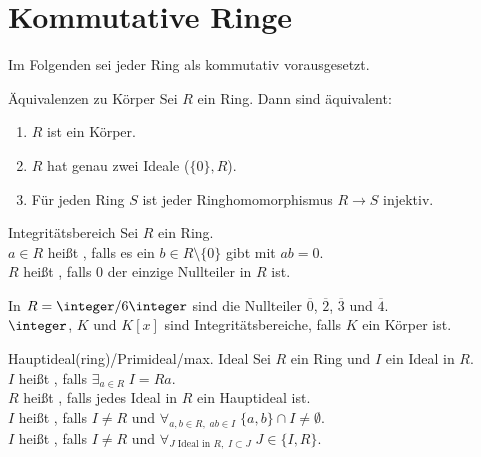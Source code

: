 \section{%
    Kommutative Ringe%
}

\begin{Bem}
    Im Folgenden sei jeder Ring als kommutativ vorausgesetzt.
\end{Bem}

\begin{Prop}{Äquivalenzen zu Körper}
    Sei $R$ ein Ring.
    Dann sind äquivalent:
    \begin{enumerate}[label=(\alph*)]
        \item
        $R$ ist ein Körper.

        \item
        $R$ hat genau zwei Ideale ($\{0\}, R$).

        \item
        Für jeden Ring $S$ ist jeder Ringhomomorphismus $R \rightarrow S$
        injektiv.
    \end{enumerate}
\end{Prop}

\begin{Def}{Integritätsbereich}
    Sei $R$ ein Ring.\\
    $a \in R$ heißt , falls es ein
    $b \in R \setminus \{0\}$ gibt mit $ab = 0$.\\
    $R$ heißt , falls $0$ der einzige Nullteiler
    in $R$ ist.
\end{Def}

\begin{Bsp}
    In $R = \integer/6\integer$ sind die Nullteiler $\overline{0}$,
    $\overline{2}$, $\overline{3}$ und $\overline{4}$.\\
    $\integer$, $K$ und $K[x]$ sind Integritätsbereiche, falls
    $K$ ein Körper ist.
\end{Bsp}

\linie

\begin{Def}{Hauptideal(ring)/Primideal/max. Ideal}
    Sei $R$ ein Ring und $I$ ein Ideal in $R$.\\
    $I$ heißt , falls $\exists_{a \in R}\; I = Ra$.\\
    $R$ heißt , falls jedes Ideal in $R$ ein Hauptideal
    ist.\\
    $I$ heißt , falls $I \not= R$ und
    $\forall_{a, b \in R,\; ab \in I}\; \{a, b\} \cap I \not= \emptyset$.\\
    $I$ heißt , falls $I \not= R$ und
    $\forall_{J \text{ Ideal in } R,\; I \subset J}\; J \in \{I, R\}$.
\end{Def}

